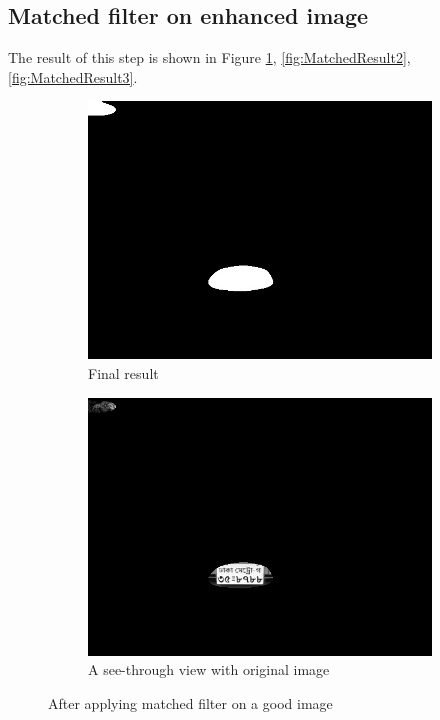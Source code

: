 \subsection{Matched filter on enhanced image}
The result of this step is shown in Figure \ref{fig:MatchedResult1}, \ref{fig:MatchedResult2}, \ref{fig:MatchedResult3}.

\begin{figure}
\begin{subfigure}{0.5\textwidth}
    \centering
    \includegraphics[width=0.9\linewidth]{./img/experiment/stage.6/good}
    \caption{Final result}
\end{subfigure}
\begin{subfigure}{0.5\textwidth}
    \centering
    \includegraphics[width=0.9\linewidth]{./img/experiment/stage.6/-3-good}
    \caption{A see-through view with original image}
\end{subfigure}
\caption{After applying matched filter on a good image}
\label{fig:MatchedResult1}
\end{figure}


